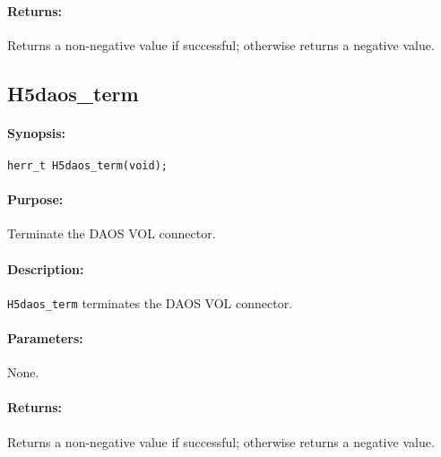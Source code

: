 \documentclass[../users_guide.tex]{subfiles}
\begin{document}
\paragraph{Returns:}
\begin{flushleft}%
Returns a non-negative value if successful; otherwise returns a negative value.
\end{flushleft}%

\newpage
\subsection{H5daos\_term}
\label{ref:h5daos_term}

\paragraph{Synopsis:}
\begin{flushleft}%
\begin{verbatim}
herr_t H5daos_term(void);
\end{verbatim}
\end{flushleft}%

\paragraph{Purpose:}
\begin{flushleft}%
Terminate the DAOS VOL connector.
\end{flushleft}%

\paragraph{Description:}
\begin{flushleft}%
\texttt{H5daos\_term} terminates the DAOS VOL connector.
\end{flushleft}%

\paragraph{Parameters:}
\begin{flushleft}%
None.
\end{flushleft}%

\paragraph{Returns:}
\begin{flushleft}%
Returns a non-negative value if successful; otherwise returns a negative value.
\end{flushleft}%
\end{document}
